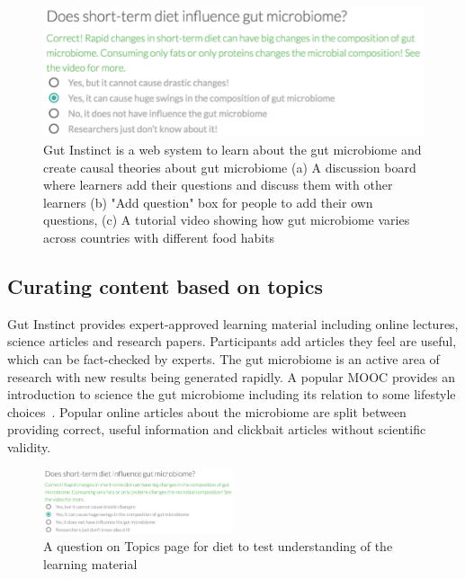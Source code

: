\begin{figure}[h] 
  \centering
  \includegraphics[width=1.0\textwidth]{figures/gutinstinct/gi-3.png}
  \caption[Gut Instinct is a web system to learn about the gut microbiome and create causal theories about gut microbiome]
{ Gut Instinct is a web system to learn about the gut microbiome and create causal theories about gut microbiome (a) A discussion board where learners add their questions and discuss them with other learners (b) "Add question" box for people to add their own questions, (c) A tutorial video showing how gut microbiome varies across countries with different food habits~\cite{Yatsunenko2012}}
  \label{fig:gi-3}
\end{figure}

\subsection{Curating content based on topics}
Gut Instinct provides expert-approved learning material including online lectures, science articles and research papers. Participants add articles they feel are useful, which can be fact-checked by experts. The gut microbiome is an active area of research with new results being generated rapidly. A popular MOOC provides an introduction to science the gut microbiome including its relation to some lifestyle choices~\cite{Knight2016}. Popular online articles about the microbiome are split between providing correct, useful information and clickbait articles without scientific validity.

\begin{figure}
  \centering
  \includegraphics[width=0.5\textwidth]{figures/gutinstinct/gi-4.png}
  \caption[A question on Topics page for diet to test understanding of the learning material]
{A question on Topics page for diet to test understanding of the learning material }
  \label{fig:gi-4}
\end{figure}

